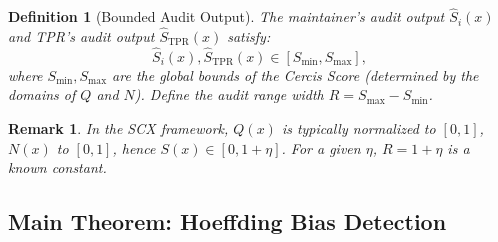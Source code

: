 \documentclass[11pt,a4paper]{article}
\newtheorem{definition}[theorem]{Definition}
\newtheorem{remark}[theorem]{Remark}
\theoremstyle{definition}
\begin{document}
\begin{definition}[Bounded Audit Output]
\label{def:bounded_audit}
The maintainer's audit output $\hat{S}_i(x)$ and TPR's audit output $\hat{S}_{\text{TPR}}(x)$ satisfy:
\begin{equation}\label{eq:bounded}
    \hat{S}_i(x), \hat{S}_{\text{TPR}}(x) \in [S_{\min}, S_{\max}],
\end{equation}
where $S_{\min}, S_{\max}$ are the global bounds of the Cercis Score (determined by the domains of $Q$ and $N$). Define the audit range width $R = S_{\max} - S_{\min}$.
\end{definition}

\begin{remark}
In the SCX framework, $Q(x)$ is typically normalized to $[0,1]$, $N(x)$ to $[0,1]$, hence $S(x) \in [0, 1+\eta]$. For a given $\eta$, $R = 1+\eta$ is a known constant.
\end{remark}

\subsection{Main Theorem: Hoeffding Bias Detection}
\end{document}
